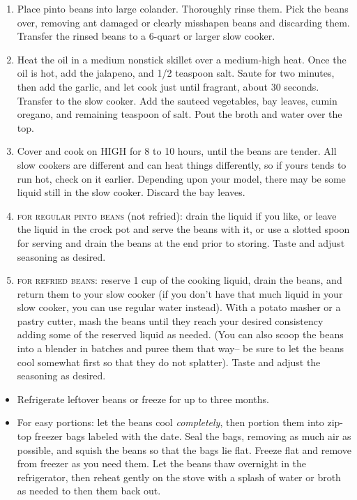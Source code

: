 \instructions
\begin{enumerate} 
		\item Place pinto beans into large colander. Thoroughly rinse them.
				Pick the beans over, removing ant damaged or clearly misshapen
				beans and discarding them. Transfer the rinsed beans to a
				6-quart or larger slow cooker. 

		\item Heat the oil in a medium nonstick skillet over a medium-high
				heat. Once the oil is hot, add the jalapeno, and 1/2 teaspoon
				salt. Saute for two minutes, then add the garlic, and let cook
				just until fragrant, about 30 seconds. Transfer to the slow
				cooker. Add the sauteed vegetables, bay leaves, cumin oregano,
				and remaining teaspoon of salt. Pout the broth and water over
				the top. 

		\item Cover and cook on HIGH for 8 to 10 hours, until the beans are
				tender. All slow cookers are different and can heat things
				differently, so if yours tends to run hot, check on it earlier.
				Depending upon your model, there may be some liquid still in
				the slow cooker. Discard the bay leaves. 

		\item \textsc{for regular pinto beans} (not refried): drain the liquid
				if you like, or leave the liquid in the crock pot and serve the
				beans with it, or use a slotted spoon for serving and drain the
				beans at the end prior to storing. Taste and adjust seasoning
				as desired. 

		\item \textsc{for refried beans}: reserve 1 cup of the cooking liquid,
				drain the beans, and return them to your slow cooker (if you
				don't have that much liquid in your slow cooker, you can use
				regular water instead). With a potato masher or a pastry
				cutter, mash the beans until they reach your desired
				consistency adding some of the reserved liquid as needed. (You
				can also scoop the beans into a blender in batches and puree
				them that way-- be sure to let the beans cool somewhat first so
				that they do not splatter). Taste and adjust the seasoning as
				desired. 
\end{enumerate}

\notes
\begin{itemize}
		\item Refrigerate leftover beans or freeze for up to three months. 
		\item For easy portions: let the beans cool \emph{completely}, then portion them into zip-top freezer bags labeled with the date. Seal the bags, removing as much air as possible, and squish the beans so that the bags lie flat. Freeze flat and remove from freezer as you need them. Let the beans thaw overnight in the refrigerator, then reheat gently on the stove with a splash of water or broth as needed to then them back out.
\end{itemize}
